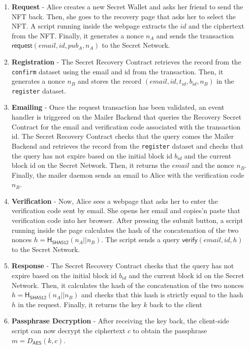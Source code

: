 \documentclass[12pt]{article}
\newcommand{\ms}[1]{\ensuremath{\mathsf{#1}}}
\newcommand{\tx}[3]{\ms{#1}(#3)}
\begin{document}
\begin{enumerate}
\item {\bf Request} - Alice creates a new Secret Wallet and asks her friend to send the NFT back. Then, she goes to the recovery page that asks her to select the NFT. A script running inside the webpage extracts the $id$ and the ciphertext from the NFT. Finally, it generates a nonce $n_A$ and sends the transaction $\tx{request}{t_{id}, b_{id}}{email, id, pub_A, n_A}$ to the Secret Network. 
\item {\bf Registration} - The Secret Recovery Contract retrieves the record from the {\tt confirm} dataset using the email and id from the transaction. Then, it generates a nonce $n_B$ and stores the record $(email, id, t_{id}, b_{id}, n_B)$ in the {\tt register} dataset.
\item {\bf Emailing} - Once the request transaction has been validated, an event handler is triggered on the Mailer Backend that queries the Recovery Secret Contract for the email and verification code associated with the transaction id. The Secret Recovery Contract checks that the query comes the Mailer Backend and retrieves the record from the {\tt register} dataset and checks that the query has not expire based on the initial block id $b_{id}$ and the current block id on the Secret Network. Then, it returns the $email$ and the nonce $n_B$. Finally, the mailer daemon sends an email to Alice with the verification code $n_B$. 
\item {\bf Verification} - Now, Alice sees a webpage that asks her to enter the verification code sent by email. She opens her email and copies'n paste that verification code into her browser. After pressing the submit button, a script running inside the page calculates the hash of the concatenation of the two nonces $h=\ms{H_{\ms{SHA512}}}(n_A || n_B)$. The script sends a query $\tx{verify}{t_{id}', b_{id}'}{email, id, h}$ to the Secret Network. 
\item {\bf Response} - The Secret Recovery Contract checks that the query has not expire based on the initial block id $b_{id}$ and the current block id on the Secret Network. Then, it calculates the hash of the concatenation of the two nonces $h=\ms{H_{\ms{SHA512}}}(n_A || n_B)$ and checks that this hash is strictly equal to the hash $h$ in the request. Finally, it returns the key $k$ back to the client
\item {\bf Passphrase Decryption} - After receiving the key back, the client-side script can now decrypt the ciphertext $c$ to obtain the passphrase $m=D_{\ms{AES}}(k, c)$. 
\end{enumerate}
\end{document}
